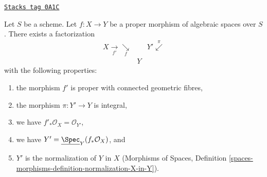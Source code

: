 \begin{theorem}

\label{spaces-more-morphisms-theorem-stein-factorization-general}
\href{https://stacks.math.columbia.edu/tag/0A1C}{\texttt{Stacks tag 0A1C}}

Let $S$ be a scheme. Let $f : X \to Y$ be a proper morphism of algebraic
spaces over $S$. There exists a factorization
$$
\begin{array}{ccc}X \underset{f'}{\longrightarrow}\underset{f}{\searrow} &  & Y' \overset{\pi}{\swarrow} \\  & Y & \end{array}
$$
with the following properties:
\begin{enumerate}
\item the morphism $f'$ is proper with connected geometric fibres,
\item the morphism $\pi : Y' \to Y$ is integral,
\item we have $f'_*\mathcal{O}_X = \mathcal{O}_{Y'}$,
\item we have $Y' = \underline{\Spec}_Y(f_*\mathcal{O}_X)$, and
\item $Y'$ is the normalization of $Y$ in $X$ (Morphisms of Spaces, Definition
\ref{spaces-morphisms-definition-normalization-X-in-Y}).
\end{enumerate}
\end{theorem}

